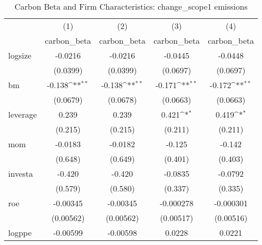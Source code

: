 \begin{table}[htbp]\centering
\def\sym#1{\ifmmode^{#1}\else\(^{#1}\)\fi}
\caption{Carbon Beta and Firm Characteristics: change\_scope1 emissions}
\begin{tabular}{l*{4}{c}}
\hline\hline
                    &\multicolumn{1}{c}{(1)}&\multicolumn{1}{c}{(2)}&\multicolumn{1}{c}{(3)}&\multicolumn{1}{c}{(4)}\\
                    &\multicolumn{1}{c}{carbon\_beta}&\multicolumn{1}{c}{carbon\_beta}&\multicolumn{1}{c}{carbon\_beta}&\multicolumn{1}{c}{carbon\_beta}\\
\hline
logsize             &     -0.0216         &     -0.0216         &     -0.0445         &     -0.0448         \\
                    &    (0.0399)         &    (0.0399)         &    (0.0697)         &    (0.0697)         \\
[1em]
bm                  &      -0.138\sym{**} &      -0.138\sym{**} &      -0.171\sym{**} &      -0.172\sym{**} \\
                    &    (0.0679)         &    (0.0678)         &    (0.0663)         &    (0.0663)         \\
[1em]
leverage            &       0.239         &       0.239         &       0.421\sym{*}  &       0.419\sym{*}  \\
                    &     (0.215)         &     (0.215)         &     (0.211)         &     (0.211)         \\
[1em]
mom                 &     -0.0183         &     -0.0182         &      -0.125         &      -0.142         \\
                    &     (0.648)         &     (0.649)         &     (0.401)         &     (0.403)         \\
[1em]
investa             &      -0.420         &      -0.420         &     -0.0835         &     -0.0792         \\
                    &     (0.579)         &     (0.580)         &     (0.337)         &     (0.335)         \\
[1em]
roe                 &    -0.00345         &    -0.00345         &   -0.000278         &   -0.000301         \\
                    &   (0.00562)         &   (0.00562)         &   (0.00517)         &   (0.00516)         \\
[1em]
logppe              &    -0.00599         &    -0.00598         &      0.0228         &      0.0221         \\

\end{tabular}
\end{table}
